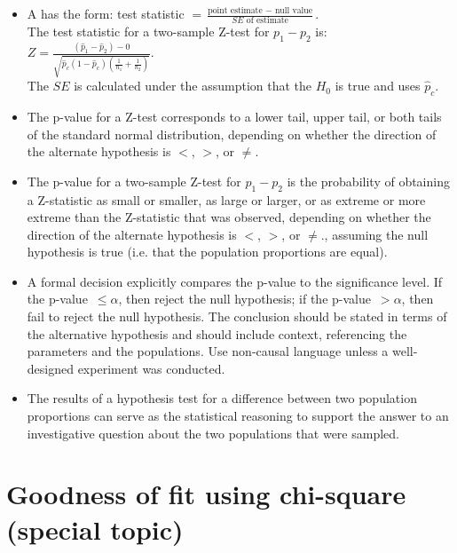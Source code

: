 \begin{itemize}
\item A  has the form: test statistic $= \frac{\text{point estimate } - \text{ null value}}{SE \text{ of estimate}}$.  \\

The test statistic for a two-sample Z-test for $p_1-p_2$ is: $Z = \frac{(\hat{p}_1 - \hat{p}_2)-0}{\sqrt{\hat{p}_c(1-\hat{p}_c)\left(\frac{1}{n_1}+\frac{1}{n_2}\right)}}$.\\

\noindent The $SE$ is calculated under the assumption that the $H_0$ is true and uses $\hat{p}_c$.


\item The p-value for a Z-test corresponds to a lower tail, upper tail, or both tails of the standard normal distribution, depending on whether the direction of the alternate hypothesis is $<$, $>$, or $\ne$.

\item The p-value for a two-sample Z-test for $p_1-p_2$ is the probability of obtaining a Z-statistic as small or smaller, as large or larger, or as extreme or more extreme than the Z-statistic that was observed, depending on whether the direction of the alternate hypothesis is $<$, $>$, or $\ne$., assuming the null hypothesis is true (i.e. that the population proportions are equal).  

\item A formal decision explicitly compares the p-value to the significance level.  If the \mbox{p-value $\le \alpha$,} then reject the null hypothesis; if the \mbox{p-value $> \alpha$,} then fail to reject the null hypothesis.   The conclusion should be stated in terms of the alternative hypothesis and should include context, referencing the parameters and the populations.  Use non-causal language unless a well-designed experiment was conducted.


\item The results of a hypothesis test for a difference between two population
proportions can serve as the statistical reasoning to support the answer to an
investigative question about the two populations that were sampled.

\end{itemize}

{}


\section[Goodness of fit using chi-square (special topic)]{Goodness of fit using chi-square (special topic) }

